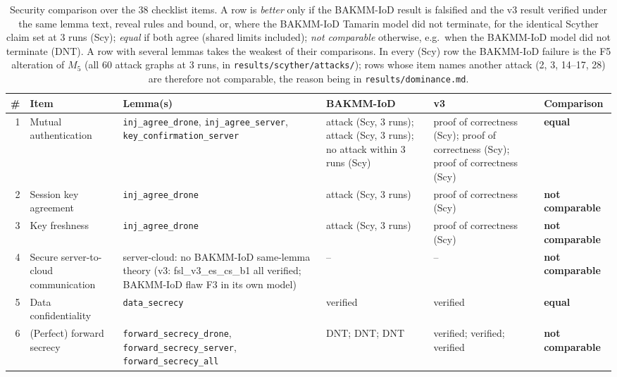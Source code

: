 \begin{table}[!t]
\centering
\footnotesize
\caption{Security comparison over the 38 checklist items. A row is \emph{better} only if the BAKMM-IoD result is falsified and the v3 result verified under the same lemma text, reveal rules and bound, or, where the BAKMM-IoD Tamarin model did not terminate, for the identical Scyther claim set at 3 runs (Scy); \emph{equal} if both agree (shared limits included); \emph{not comparable} otherwise, e.g.\ when the BAKMM-IoD model did not terminate (DNT). A row with several lemmas takes the weakest of their comparisons. In every (Scy) row the BAKMM-IoD failure is the F5 alteration of $M_5$ (all 60 attack graphs at 3 runs, in \texttt{results/scyther/attacks/}); rows whose item names another attack (2, 3, 14--17, 28) are therefore not comparable, the reason being in \texttt{results/dominance.md}.}
\label{tab:checklist}
\setlength{\tabcolsep}{2.5pt}
\begin{tabular}{rp{3.0cm}p{4.3cm}p{2.5cm}p{2.0cm}l}
\toprule
\# & Item & Lemma(s) & BAKMM-IoD & v3 & Comparison \\
\midrule
1 & Mutual authentication & \texttt{inj\_\allowbreak{}agree\_\allowbreak{}drone}, \texttt{inj\_\allowbreak{}agree\_\allowbreak{}server}, \texttt{key\_\allowbreak{}confirmation\_\allowbreak{}server} & attack (Scy, 3 runs); attack (Scy, 3 runs); no attack within 3 runs (Scy) & proof of correctness (Scy); proof of correctness (Scy); proof of correctness (Scy) & \textbf{equal} \\
2 & Session key agreement & \texttt{inj\_\allowbreak{}agree\_\allowbreak{}drone} & attack (Scy, 3 runs) & proof of correctness (Scy) & \textbf{not comparable} \\
3 & Key freshness & \texttt{inj\_\allowbreak{}agree\_\allowbreak{}drone} & attack (Scy, 3 runs) & proof of correctness (Scy) & \textbf{not comparable} \\
4 & Secure server-to-cloud communication & server-cloud: no BAKMM-IoD same-lemma theory (v3: fsl\_v3\_es\_cs\_b1 all verified; BAKMM-IoD flaw F3 in its own model) & -- & -- & \textbf{not comparable} \\
5 & Data confidentiality & \texttt{data\_\allowbreak{}secrecy} & verified & verified & \textbf{equal} \\
6 & (Perfect) forward secrecy & \texttt{forward\_\allowbreak{}secrecy\_\allowbreak{}drone}, \texttt{forward\_\allowbreak{}secrecy\_\allowbreak{}server}, \texttt{forward\_\allowbreak{}secrecy\_\allowbreak{}all} & DNT; DNT; DNT & verified; verified; verified & \textbf{not comparable} \\

\end{tabular}
\end{table}
